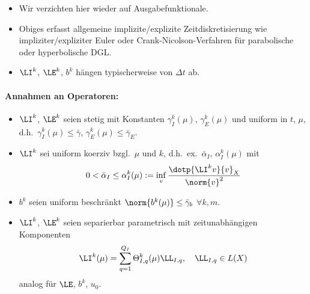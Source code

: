 \begin{bem} \beginwithlistbem
	\begin{itemize}
		\item Wir verzichten hier wieder auf Ausgabefunktionale.
		\item Obiges erfasst allgemeine implizite/explizite Zeitdiskretisierung wie impliziter/expliziter Euler oder Crank-Nicolson-Verfahren für parabolische oder hyperbolische DGL.
		\item $\LI^k$, $\LE^k$, $b^k$ hängen typischerweise von $\Delta t$ ab.
	\end{itemize}
\end{bem}

\paragraph{Annahmen an Operatoren:}

\begin{itemize}
	\item $\LI^k$, $\LE^k$ seien stetig mit Konstanten $\gamma_I^k(\mu)$, $\gamma_E^k(\mu)$ und uniform in $t$, $\mu$, d.h.\ $\gamma_I^k(\mu) \leq \bar\gamma$, $\gamma_E^k(\mu) \leq \bar\gamma_E$.
	\item $\LI^k$ sei uniform koerziv bzgl.\ $\mu$ und $k$, d.h.\ ex.\ $\bar\alpha_I$, $\alpha_I^k(\mu)$ mit
		\[
			0 < \bar\alpha_I \leq \alpha_I^k(\mu) := \inf_v \frac{\dotp{\LI^k v}{v}_X}{\norm{v}^2}
		\]
	\item $b^k$ seien uniform beschränkt $\norm{b^k(\mu)} \leq \bar\gamma_b$ $\forall k, m$.
	\item $\LI^k$, $\LE^k$ seien separierbar parametrisch mit zeitunabhängigen Komponenten
		\[
			\LI^k(\mu) = \sum_{q=1}^{Q_I} \Theta_{I,q}^k(\mu) \LL_{I,q}, \quad \LL_{I,q} \in L(X)
		\]
		analog für $\LE$, $b^k$, $u_0$.
\end{itemize}

